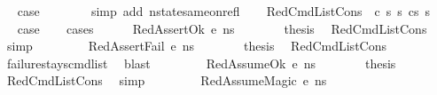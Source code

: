 \begin{isabellebody}
\ \isamarkupfalse%
\ {\isacharquery}{\kern0pt}case\ \isanewline
\ \ \ \ \ \isamarkupfalse%
\ {\isacharparenleft}{\kern0pt}simp\ add{\isacharcolon}{\kern0pt}\ nstate{\isacharunderscore}{\kern0pt}same{\isacharunderscore}{\kern0pt}on{\isacharunderscore}{\kern0pt}refl{\isacharparenright}{\kern0pt}\isanewline
{}\isamarkupfalse%
\isanewline
\ \ \isamarkupfalse%
\ {\isacharparenleft}{\kern0pt}RedCmdListCons\ {\isasymOmega}\ c\ s\ s{\isacharprime}{\kern0pt}{\isacharprime}{\kern0pt}\ cs\ s{\isacharprime}{\kern0pt}{\isacharparenright}{\kern0pt}\isanewline
\ \ \isamarkupfalse%
\ \isamarkupfalse%
\ {\isacharquery}{\kern0pt}case\isanewline
\ \ \isamarkupfalse%
\ cases\isanewline
\ \ \ \ \isamarkupfalse%
\ {\isacharparenleft}{\kern0pt}RedAssertOk\ e\ n{\isacharunderscore}{\kern0pt}s{\isacharparenright}{\kern0pt}\isanewline
\ \ \ \ \isamarkupfalse%
\ \isamarkupfalse%
\ {\isacharquery}{\kern0pt}thesis\ \isamarkupfalse%
\ RedCmdListCons\ \isamarkupfalse%
\ simp\isanewline
\ \ \isamarkupfalse%
\isanewline
\ \ \ \ \isamarkupfalse%
\ {\isacharparenleft}{\kern0pt}RedAssertFail\ e\ n{\isacharunderscore}{\kern0pt}s{\isacharparenright}{\kern0pt}\isanewline
\ \ \ \ \isamarkupfalse%
\ \isamarkupfalse%
\ {\isacharquery}{\kern0pt}thesis\ \isamarkupfalse%
\ RedCmdListCons\ \isanewline
\ \ \ \ \ \ \isamarkupfalse%
\ failure{\isacharunderscore}{\kern0pt}stays{\isacharunderscore}{\kern0pt}cmd{\isacharunderscore}{\kern0pt}list\ \isamarkupfalse%
\ blast\isanewline
\ \ \isamarkupfalse%
\isanewline
\ \ \ \ \isamarkupfalse%
\ {\isacharparenleft}{\kern0pt}RedAssumeOk\ e\ n{\isacharunderscore}{\kern0pt}s{\isacharparenright}{\kern0pt}\isanewline
\ \ \ \ \isamarkupfalse%
\ \isamarkupfalse%
\ {\isacharquery}{\kern0pt}thesis\ \isamarkupfalse%
\ RedCmdListCons\ \isamarkupfalse%
\ simp\isanewline
\ \ \isamarkupfalse%
\isanewline
\ \ \ \ \isamarkupfalse%
\ {\isacharparenleft}{\kern0pt}RedAssumeMagic\ e\ n{\isacharunderscore}{\kern0pt}s{\isacharparenright}{\kern0pt}\isanewline
\ \ \ \ \isamarkupfalse%
\ \isamarkupfalse%

\end{isabellebody}
